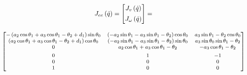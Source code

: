 \begin{gather}\label{eq:j}
        J_{ee}\left(\dot{q}\right) = 
        \begin{bmatrix}
            J_v\left(\dot{q}\right) \\[1ex]
            J_{\omega}\left(\dot{q}\right)
        \end{bmatrix} = \\[2ex]
        {\footnotesize\begin{bmatrix}
            - \left(a_{2} \cos{\theta_{1}} + a_{3} \cos{\theta_{1} - \theta_{2}} + d_{1}\right) \sin{\theta_{0}} & \left(- a_{2} \sin{\theta_{1}} - a_{3} \sin{\theta_{1} - \theta_{2}}\right) \cos{\theta_{0}} & a_{3} \sin{\theta_{1} - \theta_{2}} \cos{\theta_{0}} \\
            \left(a_{2} \cos{\theta_{1}} + a_{3} \cos{\theta_{1} - \theta_{2}} + d_{1}\right) \cos{\theta_{0}}   & \left(- a_{2} \sin{\theta_{1}} - a_{3} \sin{\theta_{1} - \theta_{2}}\right) \sin{\theta_{0}} & a_{3} \sin{\theta_{0}} \sin{\theta_{1} - \theta_{2}} \\
            0                                                                                                                                              & a_{2} \cos{\theta_{1}} + a_{3} \cos{\theta_{1} - \theta_{2}}                                               & - a_{3} \cos{\theta_{1} - \theta_{2}}                              \\[1ex]
            0                                                                                                                                              & 1                                                                                                                                      & -1                                                                               \\
            0                                                                                                                                              & 0                                                                                                                                      & 0                                                                                \\
            1                                                                                                                                              & 0                                                                                                                                      & 0                                                                                \\
        \end{bmatrix}} \nonumber
\end{gather}

